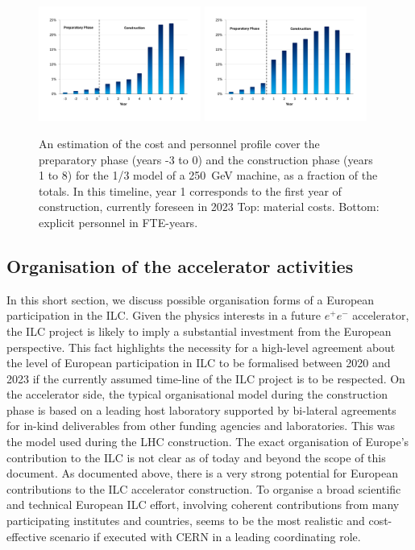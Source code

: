 \documentclass[%
 reprint,
 floatfix,
 amsmath,amssymb,
 aps,
]{revtex4-1}
\def\ee{e^+e^-}
\begin{document}
\begin{figure}[htbp]
\includegraphics[width=0.475\textwidth]{figures/ilc-eu-ikc-cost-profile-blue-250me.pdf}
\includegraphics[width=0.475\textwidth]{figures/ilc-eu-ikc-cost-profile-blue-fte.pdf}
\caption{\label{fig:costprofile:costprofile} An estimation of the cost and personnel profile cover the preparatory phase (years -3 to 0) 
and the construction phase (years 1 to 8) for the 1/3 model of a 250~GeV machine, as a fraction of the
totals. In this timeline, 
year 1 corresponds to the first year of construction, currently foreseen in 2023 
Top: material costs. Bottom: explicit personnel in FTE-years.
}
\end{figure}


\subsection{\label{sec:acc:org}Organisation of the accelerator activities}

In this short section, we discuss possible organisation forms of a European
participation in the ILC. 
Given the physics interests in a future $\ee$ accelerator, the ILC project is likely to imply a substantial investment from
the European perspective. This fact highlights the necessity for a high-level
agreement about the level of European participation in ILC to be formalised between 2020
and 2023 if the currently assumed time-line of the ILC project is to be respected.
On the accelerator side, the typical organisational model during the construction phase is based on a leading host laboratory supported by 
bi-lateral agreements for in-kind deliverables from other funding agencies and laboratories. This was the model used during the LHC construction. 
The exact organisation of Europe's contribution to the ILC is not clear as of today and beyond the scope of this document. 
As documented above, there is a very strong potential for European contributions to the ILC accelerator construction.
To organise a broad scientific and technical European ILC effort, involving coherent contributions from many participating institutes and countries, seems to be the most realistic and cost-effective scenario if executed with CERN in a leading coordinating role.
\end{document}

